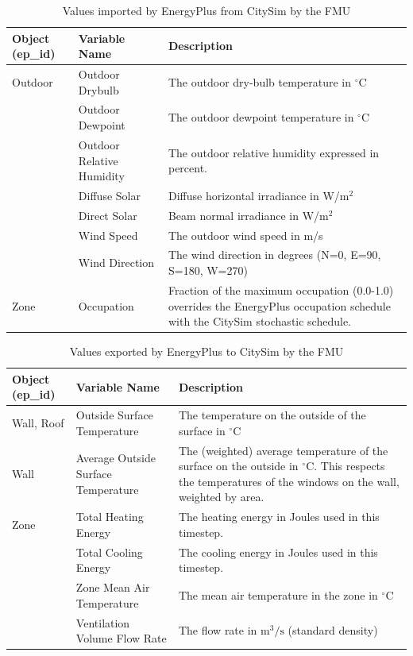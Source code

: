 \documentclass{tBPS2e}
\theoremstyle{plain}
\theoremstyle{definition}
\theoremstyle{remark}
\begin{document}
\begin{table}
\centering
\caption{Values imported by EnergyPlus from CitySim by the FMU}
\label{tab:FMUimports}
\centering
\begin{tabular}{|p{1.3cm}|p{1.9cm}|p{3.2cm}|}
  \hline
  \bf{Object (ep\_id)} &  \bf{Variable Name} & \bf{Description} \\
    \hline
Outdoor & Outdoor Drybulb & The outdoor dry-bulb temperature in $^{\circ}\mathrm{C}$ \\
     \hline
 & Outdoor Dewpoint & The outdoor dewpoint temperature in $^{\circ}\mathrm{C}$ \\
     \hline
 & Outdoor Relative Humidity & The outdoor relative humidity expressed in percent. \\
     \hline
 & Diffuse Solar & Diffuse horizontal irradiance in W/m$^2$ \\
     \hline
 & Direct Solar & Beam normal irradiance in W/m$^2$ \\
     \hline
 & Wind Speed & The outdoor wind speed in m/s \\
     \hline
 & Wind Direction & The wind direction in degrees (N=0, E=90, S=180, W=270) \\
     \hline
Zone & Occupation & Fraction of the maximum occupation (0.0-1.0) overrides the EnergyPlus occupation schedule with the CitySim stochastic schedule. \\
    \hline
\end{tabular}
\end{table}

\begin{table}
\caption{Values exported by EnergyPlus to CitySim by the FMU}
\label{tab:FMUexports}
\centering
\begin{tabular}{|p{1.3cm}|p{1.9cm}|p{3.2cm}|}
  \hline
  \bf{Object (ep\_id)} &  \bf{Variable Name} & \bf{Description} \\
    \hline
Wall, Roof & Outside Surface Temperature & The temperature on the outside of the surface in $^{\circ}\mathrm{C}$ \\    
    \hline
Wall & Average Outside Surface Temperature & The (weighted) average temperature of the surface on the outside in $^{\circ}\mathrm{C}$. This respects the temperatures of the windows on the wall, weighted by area. \\
    \hline
Zone & Total Heating Energy & The heating energy in Joules used in this timestep. \\
    \hline
 & Total Cooling Energy & The cooling energy in Joules used in this timestep. \\
    \hline
 & Zone Mean Air Temperature & The mean air temperature in the zone in $^{\circ}\mathrm{C}$ \\
    \hline
 & Ventilation Volume Flow Rate & The flow rate in $\mathrm{m}^3/\mathrm{s}$ (standard density) \\
    \hline
\end{tabular}
\end{table}
\end{document}
